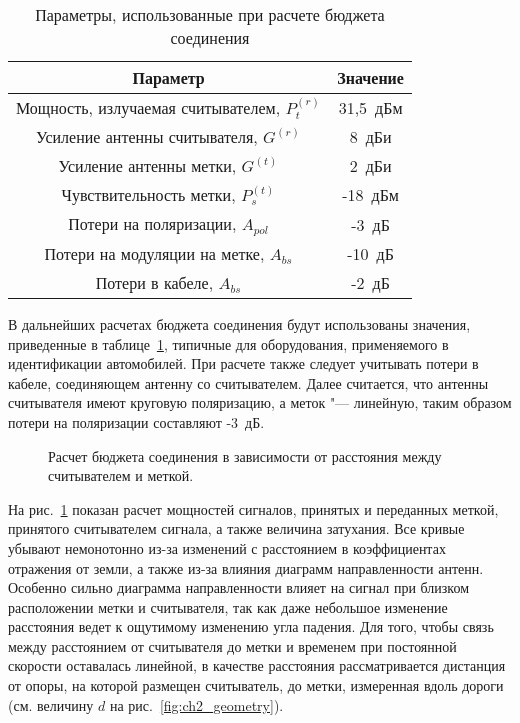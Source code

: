 \begin{table}[!t]
	\renewcommand{\arraystretch}{1.3}
	\caption{Параметры, использованные при расчете бюджета соединения}
	\label{table:ch2_budget_params}
	\centering
	\begin{tabular}{|c|c|}\hline
		Параметр & Значение \\\hline
		Мощность, излучаемая считывателем, $P_t^{(r)}$ & 31,5~дБм\\
		Усиление антенны считывателя, $G^{(r)}$ & 8~дБи\\
		Усиление антенны метки, $G^{(t)}$ & 2~дБи\\
		Чувствительность метки, $P_s^{(t)}$ & -18~дБм\\
		Потери на поляризации, $A_{pol}$ & -3~дБ\\
		Потери на модуляции на метке, $A_{bs}$ & -10~дБ\\
		Потери в кабеле, $A_{bs}$ & -2~дБ\\
		\hline
	\end{tabular}
\end{table}

В дальнейших расчетах бюджета соединения будут использованы значения, приведенные в таблице~\ref{table:ch2_budget_params}, типичные для оборудования, применяемого в идентификации автомобилей. При расчете также следует учитывать потери в кабеле, соединяющем антенну со считывателем. Далее считается, что антенны считывателя имеют круговую поляризацию, а меток "--- линейную, таким образом потери на поляризации составляют -3~дБ.

\begin{figure}[h]
	\caption{Расчет бюджета соединения в зависимости от расстояния между считывателем и меткой.}
	\label{fig:ch2_link_budget}
\end{figure}

На рис.~\ref{fig:ch2_link_budget} показан расчет мощностей сигналов, принятых и переданных меткой, принятого считывателем сигнала, а также величина затухания. Все кривые убывают немонотонно из-за изменений с расстоянием в коэффициентах отражения от земли, а также из-за влияния диаграмм направленности антенн. Особенно сильно диаграмма направленности влияет на сигнал при близком расположении метки и считывателя, так как даже небольшое изменение расстояния ведет к ощутимому изменению угла падения. Для того, чтобы связь между расстоянием от считывателя до метки и временем при постоянной скорости оставалась линейной, в качестве расстояния рассматривается дистанция от опоры, на которой размещен считыватель, до метки, измеренная вдоль дороги (см. величину $d$ на рис.~\ref{fig:ch2_geometry}).



